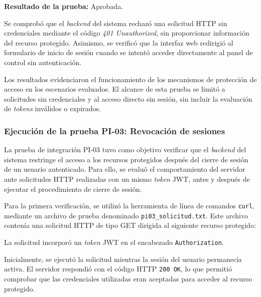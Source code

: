 \FloatBarrier

\noindent\textbf{Resultado de la prueba:} Aprobada.

Se comprobó que el \textit{backend} del sistema rechazó una solicitud HTTP sin credenciales mediante el código \textit{401 Unauthorized}, sin proporcionar información del recurso protegido. Asimismo, se verificó que la interfaz web redirigió al formulario de inicio de sesión cuando se intentó acceder directamente al panel de control sin autenticación.

Los resultados evidenciaron el funcionamiento de los mecanismos de protección de acceso en los escenarios evaluados. El alcance de esta prueba se limitó a solicitudes sin credenciales y al acceso directo sin sesión, sin incluir la evaluación de \textit{tokens} inválidos o expirados.



\subsubsection[Ejecución de PI-03: Revocación de sesiones]{Ejecución de la prueba PI-03: Revocación de sesiones}

La prueba de integración PI-03 tuvo como objetivo verificar que el \textit{backend} del sistema restringe el acceso a los recursos protegidos después del cierre de sesión de un usuario autenticado. Para ello, se evaluó el comportamiento del servidor ante solicitudes HTTP realizadas con un mismo \textit{token} JWT, antes y después de ejecutar el procedimiento de cierre de sesión.



Para la primera verificación, se utilizó la herramienta
de línea de comandos \texttt{curl}, mediante un archivo
de prueba denominado \texttt{pi03\_solicitud.txt}.
Este archivo contenía una solicitud HTTP de tipo GET
dirigida al siguiente recurso protegido:

\begin{center}
\end{center}

La solicitud incorporó un \textit{token} JWT en el encabezado
\texttt{Authorization}.


Inicialmente, se ejecutó la solicitud mientras la sesión del usuario permanecía activa. El servidor respondió con el código HTTP \texttt{200 OK}, lo que permitió comprobar que las credenciales utilizadas eran aceptadas para acceder al recurso protegido.

